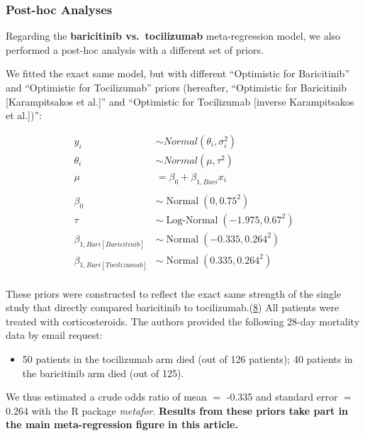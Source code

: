 \documentclass[
  12pt,
]{article}
\providecommand{\tightlist}{%
  \setlength{\itemsep}{0pt}\setlength{\parskip}{0pt}}
\begin{document}
\newpage

\hypertarget{post-hoc-analyses}{%
\subsubsection{Post-hoc Analyses}\label{post-hoc-analyses}}

Regarding the \textbf{baricitinib vs.~tocilizumab} meta-regression
model, we also performed a post-hoc analysis with a different set of
priors.

We fitted the exact same model, but with different ``Optimistic for
Baricitinib'' and ``Optimistic for Tocilizumab'' priors (hereafter,
``Optimistic for Baricitinib {[}Karampitsakos et al.{]}'' and
``Optimistic for Tocilizumab {[}inverse Karampitsakos et al.{]})'':

\begin{align*}
y_i & \sim Normal(\theta_i, \sigma_i^2) \tag{Likelihood}\\
\theta_i & \sim Normal(\mu, \tau^2)\\
\mu &= \beta_0 + \beta_{1, Bari} x_i\\
\\
\beta_0 & \sim \operatorname{Normal}(0, 0.75^2) \tag{Priors}\\
\tau & \sim \operatorname{Log-Normal}(-1.975, 0.67^2)\\
\beta_{1, Bari[Baricitinib]} & \sim \operatorname{Normal}(-0.335, 0.264^2)\\
\beta_{1, Bari[Tocilizumab]} & \sim \operatorname{Normal}(0.335, 0.264^2)\\
\end{align*}

These priors were constructed to reflect the exact same strength of the
single study that directly compared baricitinib to
tocilizumab.(\protect\hyperlink{ref-karampitsakos2022}{8}) All patients
were treated with corticosteroids. The authors provided the following
28-day mortality data by email request:

\begin{itemize}
\tightlist
\item
  50 patients in the tocilizumab arm died (out of 126 patients); 40
  patients in the baricitinib arm died (out of 125).
\end{itemize}

We thus estimated a crude odds ratio of mean \(=\) -0.335 and standard
error \(=\) 0.264 with the R package \emph{metafor}. \textbf{Results
from these priors take part in the main meta-regression figure in this
article.}
\end{document}
